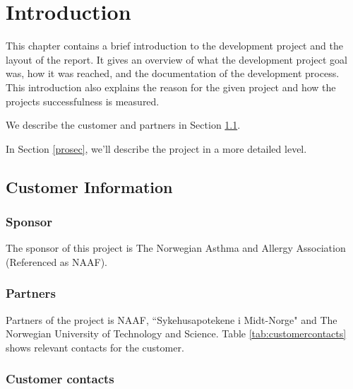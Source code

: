 \chapter{Introduction}  
\label{intro}
This chapter contains a brief introduction to the
development project and the layout of the report. It gives an overview of what
the development project goal was, how it was reached, and the documentation of
the development process. This introduction also explains the reason for the
given project and how the projects successfulness is measured. 


We describe the customer and partners in Section \ref{sec:custinf}. 

In Section \ref{prosec}, we'll describe the project in a more detailed level.  

\section{Customer Information}
\label{sec:custinf}
\subsection{Sponsor}
The sponsor of this project is The Norwegian Asthma and Allergy Association (Referenced as NAAF).

\subsection{Partners}
Partners of the project is NAAF, ``Sykehusapotekene i Midt-Norge" and The
Norwegian University of Technology and Science. Table \ref{tab:customercontacts} shows
relevant contacts for the customer. 

\subsection{Customer contacts}

